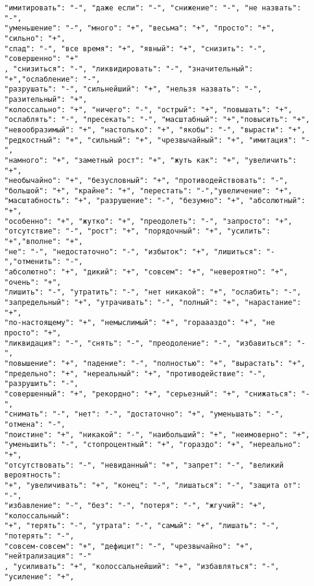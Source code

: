 \begin{lstlisting}[caption="Словосочетания используемые для составления тональных префиксов", label={lst:tonePrefixes}]
"имитировать": "-", "даже если": "-", "снижение": "-", "не назвать": "-",
"уменьшение": "-", "много": "+", "весьма": "+", "просто": "+", "сильно": "+",
"спад": "-", "все время": "+", "явный": "+", "снизить": "-", "совершенно": "+"
, "снизиться": "-", "ликвидировать": "-", "значительный": "+","ослабление": "-",
"разрушать": "-", "сильнейший": "+", "нельзя назвать": "-", "разительный": "+",
"колоссально": "+", "ничего": "-", "острый": "+", "повышать": "+",
"ослаблять": "-", "пресекать": "-", "масштабный": "+","повысить": "+",
"невообразимый": "+", "настолько": "+", "якобы": "-", "вырасти": "+",
"редкостный": "+", "сильный": "+", "чрезвычайный": "+", "имитация": "-",
"намного": "+", "заметный рост": "+", "жуть как": "+", "увеличить": "+",
"необычайно": "+", "безусловный": "+", "противодействовать": "-",
"большой": "+", "крайне": "+", "перестать": "-","увеличение": "+",
"масштабность": "+", "разрушение": "-", "безумно": "+", "абсолютный": "+",
"особенно": "+", "жутко": "+", "преодолеть": "-", "запросто": "+",
"отсутствие": "-", "рост": "+", "порядочный": "+", "усилить": "+","вполне": "+",
"не": "-", "недостаточно": "-", "избыток": "+", "лишиться": "-","отменить": "-",
"абсолютно": "+", "дикий": "+", "совсем": "+", "невероятно": "+", "очень": "+",
"лишить": "-", "утратить": "-", "нет никакой": "+", "ослабить": "-",
"запредельный": "+", "утрачивать": "-", "полный": "+", "нарастание": "+",
"по-настоящему": "+", "немыслимый": "+", "гораааздо": "+", "не просто": "+",
"ликвидация": "-", "снять": "-", "преодоление": "-", "избавиться": "-",
"повышение": "+", "падение": "-", "полностью": "+", "вырастать": "+",
"предельно": "+", "нереальный": "+", "противодействие": "-", "разрушить": "-",
"совершенный": "+", "рекордно": "+", "серьезный": "+", "снижаться": "-",
"снимать": "-", "нет": "-", "достаточно": "+", "уменьшать": "-", "отмена": "-",
"поистине": "+", "никакой": "-", "наибольший": "+", "неимоверно": "+",
"уменьшить": "-", "стопроцентный": "+", "гораздо": "+", "нереально": "+",
"отсутствовать": "-", "невиданный": "+", "запрет": "-", "великий вероятность":
"+", "увеличивать": "+", "конец": "-", "лишаться": "-", "защита от": "-",
"избавление": "-", "без": "-", "потеря": "-", "жгучий": "+", "колоссальный":
"+", "терять": "-", "утрата": "-", "самый": "+", "лишать": "-", "потерять": "-",
"совсем-совсем": "+", "дефицит": "-", "чрезвычайно": "+", "нейтрализация": "-"
, "усиливать": "+", "колоссальнейший": "+", "избавляться": "-", "усиление": "+",
\end{lstlisting}

